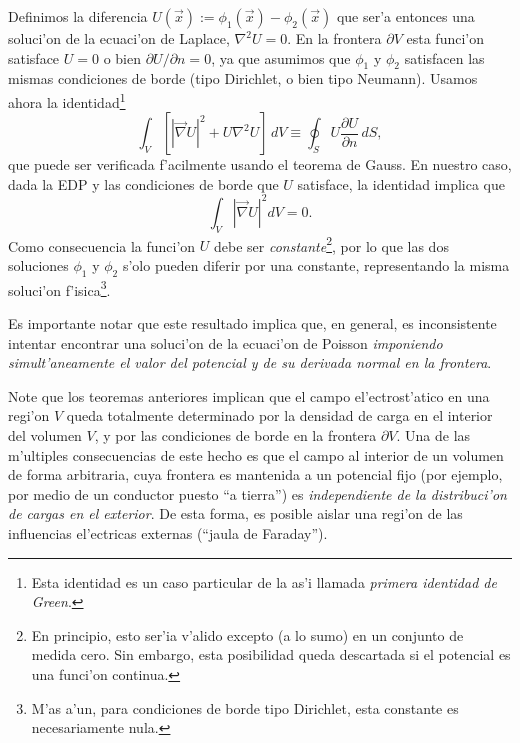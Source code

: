 Definimos la diferencia $U(\vec{x}):=\phi_1(\vec{x})-\phi_2(\vec{x})$ que ser'a entonces una soluci'on de la ecuaci'on de Laplace, $\nabla^2U=0$. En la frontera $\partial V$ esta funci'on satisface $U=0$ o bien ${\partial U}/{\partial n}=0$, ya que asumimos que $\phi_1$ y $\phi_2$ satisfacen las mismas condiciones de borde (tipo Dirichlet, o bien tipo Neumann). Usamos ahora la identidad\footnote{Esta identidad es un caso particular de la as'i llamada \textit{primera identidad de Green}.}
\begin{equation}
 \int_V\left[\left|\vec\nabla U\right|^2+U\nabla^2U\right]  \,dV
 \equiv\oint_SU\frac{\partial U}{\partial n}\,dS,
 \end{equation}
que puede ser verificada f'acilmente usando el teorema de Gauss. En nuestro caso, dada la EDP y las condiciones de borde que $U$ satisface, la identidad implica que
\begin{equation}
 \int_V\left|\vec\nabla U\right|^2dV=0.
\end{equation}
Como consecuencia la funci'on $U$ debe ser \textit{constante}\footnote{En principio, esto ser'ia v'alido excepto (a lo sumo) en un conjunto de medida cero. Sin embargo, esta posibilidad queda descartada si el potencial es una funci'on continua.}, por lo que las dos soluciones $\phi_1$ y $\phi_2$ s'olo pueden diferir por una constante, representando la misma soluci'on f'isica\footnote{M'as a'un, para condiciones de borde tipo Dirichlet, esta constante es necesariamente nula.}.

Es importante notar que este resultado implica que, en general, es inconsistente intentar encontrar una soluci'on de la ecuaci'on de Poisson \textit{imponiendo simult'aneamente el valor del potencial y de su derivada normal en la frontera}.

Note que los teoremas anteriores implican que el campo el'ectrost'atico en una regi'on $V$ queda totalmente determinado por la densidad de carga en el interior del volumen $V$, y por las condiciones de borde en la frontera $\partial V$. Una de las m'ultiples consecuencias de este hecho es que el campo al interior de un volumen de forma arbitraria, cuya frontera es mantenida a un potencial fijo (por ejemplo, por medio de un conductor puesto ``a tierra'') es \textit{independiente de la distribuci'on de cargas en el exterior}. De esta forma, es posible aislar una regi'on de las influencias el'ectricas externas (``jaula de Faraday'').


